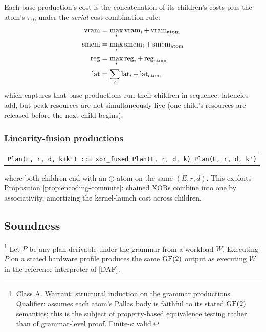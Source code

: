 Each base production's cost is the concatenation of
its children's costs plus the atom's $\pi_0$, under
the \emph{serial} cost-combination rule:
\begin{align}
  \operatorname{vram} &= \max_i \operatorname{vram}_i + \operatorname{vram}_{\mathrm{atom}} \\
  \operatorname{smem} &= \max_i \operatorname{smem}_i + \operatorname{smem}_{\mathrm{atom}} \\
  \operatorname{reg}  &= \max_i \operatorname{reg}_i  + \operatorname{reg}_{\mathrm{atom}}  \\
  \operatorname{lat}  &= \sum_i \operatorname{lat}_i + \operatorname{lat}_{\mathrm{atom}}
\end{align}
which captures that base productions run their
children in sequence: latencies add, but peak resources
are not simultaneously live (one child's resources are
released before the next child begins).

\subsubsection*{Linearity-fusion productions}

\begin{center}
\small
\begin{tabular}{l}
\verb|Plan(E, r, d, k+k') ::= xor_fused Plan(E, r, d, k) Plan(E, r, d, k')|
\end{tabular}
\end{center}

where both children end with an $\oplus$ atom on the
same $(E, r, d)$. This exploits
Proposition \ref{prop:encoding-commute}: chained XORs
combine into one by associativity, amortizing the
kernel-launch cost across children.

\subsection{Soundness}

\begin{theorem}\label{thm:soundness}
  \footnote{Class \textsf{A}. Warrant: structural
  induction on the grammar productions. Qualifier:
  assumes each atom's Pallas body is faithful to its
  stated $\operatorname{GF}(2)$ semantics; this is the subject of
  property-based equivalence testing rather than of
  grammar-level proof. Finite-$\kappa$ valid.}
  Let $P$ be any plan derivable under the grammar
  from a workload $W$. Executing $P$ on a stated
  hardware profile produces the same $\operatorname{GF}(2)$ output
  as executing $W$ in the reference interpreter of
  [DAF].
\end{theorem}


